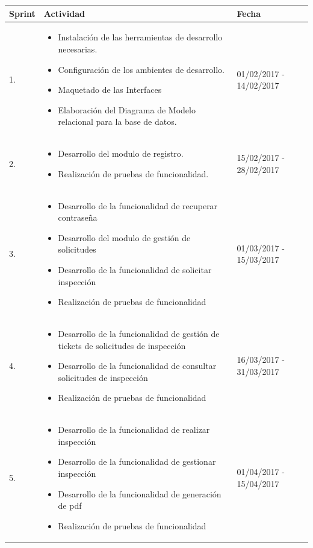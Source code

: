 \begin{table}[htb]	
\begin{center}
\begin{tabular}{ | m{2cm} | m{9cm}| m{3cm}| } 
 \hline
 Sprint & Actividad & Fecha \\
 \hline
 1. 
 & 
 \begin{itemize}
 	\item Instalación de las herramientas de desarrollo necesarias.
 	\item Configuración de los ambientes de desarrollo.
 	\item Maquetado de las Interfaces
 	\item Elaboración del Diagrama de Modelo relacional para la base de datos.
 \end{itemize}
 & 
 01/02/2017 - 14/02/2017\\
 \hline

 2. 
 & 
 \begin{itemize}
 	\item Desarrollo del modulo de registro.
 	\item Realización de pruebas de funcionalidad.
 \end{itemize}
 & 
 15/02/2017 - 28/02/2017\\
 \hline

 3.
 & 
 \begin{itemize}
 	\item Desarrollo de la funcionalidad de recuperar contraseña
 	\item Desarrollo del modulo de gestión de solicitudes
 	\item Desarrollo de la funcionalidad de solicitar inspección
 	\item Realización de pruebas de funcionalidad
 \end{itemize}
 & 
 01/03/2017 - 15/03/2017\\
 \hline
 
 4.
 & 
 \begin{itemize}
 	\item Desarrollo de la funcionalidad de gestión de tickets de solicitudes de inspección
 	\item Desarrollo de la funcionalidad de consultar solicitudes de inspección
 	\item Realización de pruebas de funcionalidad
 \end{itemize}
 & 
 16/03/2017 - 31/03/2017\\
 \hline
 
 5. 
 & 
 \begin{itemize}
 	\item Desarrollo de la funcionalidad de realizar inspección
 	\item Desarrollo de la funcionalidad de gestionar inspección
 	\item Desarrollo de la funcionalidad de generación de pdf
 	\item Realización de pruebas de funcionalidad
 \end{itemize}
 & 
 01/04/2017 - 15/04/2017\\
 \hline


\end{tabular}
\end{center}
\end{table}

